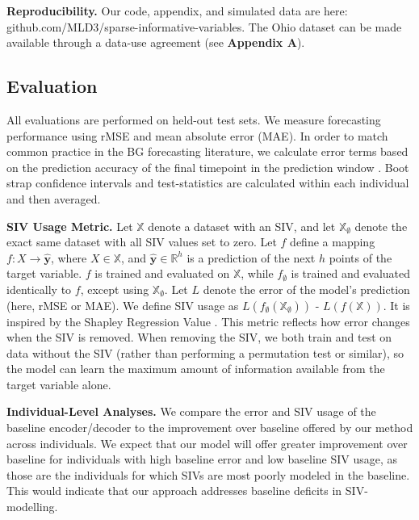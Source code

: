 \documentclass[letterpaper]{article}
\begin{document}
\textbf{Reproducibility.} Our code, appendix, and simulated data are here: github.com/MLD3/sparse-informative-variables. The Ohio dataset can be made available through a data-use agreement (see \textbf{Appendix A}). 


\subsection{Evaluation}

All evaluations are performed on held-out test sets. We measure forecasting performance using rMSE and mean absolute error (MAE). In order to match common practice in the BG forecasting literature, we calculate error terms based on the prediction accuracy of the final timepoint in the prediction window \cite{kn:oc}. Boot strap confidence intervals and test-statistics are calculated within each individual and then averaged.

\textbf{SIV Usage Metric.} Let $\mathbb{X}$ denote a dataset with an SIV, and let $\mathbb{X_\emptyset}$ denote the exact same dataset with all SIV values set to zero. Let $f$ define a mapping $f:X\rightarrow \mathbf{\hat{y}}$, where $X \in \mathbb{X}$, and $\mathbf{\hat{y}} \in \mathbb{R}^h$ is a prediction of the next $h$ points of the target variable. $f$ is trained and evaluated on $\mathbb{X}$, while $f_\emptyset$ is trained and evaluated identically to $f$, except using $\mathbb{X_\emptyset}$. Let $L$ denote the error of the model's prediction (here, rMSE or MAE). We define SIV usage as $L(f_\emptyset(\mathbb{X_\emptyset}))$ - $L(f(\mathbb{X}))$. It is inspired by the Shapley Regression Value \cite{shap}. This metric reflects how error changes when the SIV is removed. When removing the SIV, we both train and test on data without the SIV (rather than performing a permutation test or similar), so the model can learn the maximum amount of information available from the target variable alone.

 




 
\textbf{Individual-Level Analyses.} We compare the error and SIV usage of the baseline encoder/decoder to the improvement over baseline offered by our method across individuals.  We expect that our model will offer greater improvement over baseline for individuals with high baseline error and low baseline SIV usage, as those are the individuals for which SIVs are most poorly modeled in the baseline. This would indicate that our approach addresses baseline deficits in SIV-modelling.
 
\end{document}
